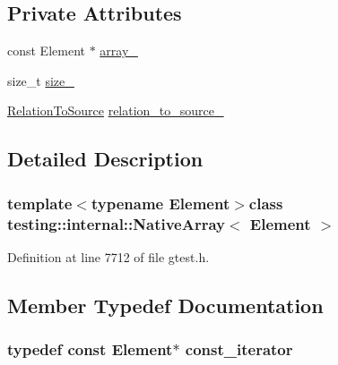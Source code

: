 \subsection*{\-Private \-Attributes}
\begin{DoxyCompactItemize}
\item 
const \-Element $\ast$ \hyperlink{classtesting_1_1internal_1_1NativeArray_a31f6e6efcce9fbf668b824a86a909496}{array\-\_\-}
\item 
size\-\_\-t \hyperlink{classtesting_1_1internal_1_1NativeArray_a5f31775800bbb46b35b5791def1f3acc}{size\-\_\-}
\item 
\hyperlink{namespacetesting_1_1internal_ac00b9b1c1f19789e7b9ffda5a5d6cbf6}{\-Relation\-To\-Source} \hyperlink{classtesting_1_1internal_1_1NativeArray_a60cdb26cc04b8a24e80287106524f1bc}{relation\-\_\-to\-\_\-source\-\_\-}
\end{DoxyCompactItemize}


\subsection{\-Detailed \-Description}
\subsubsection*{template$<$typename \-Element$>$class testing\-::internal\-::\-Native\-Array$<$ Element $>$}



\-Definition at line 7712 of file gtest.\-h.



\subsection{\-Member \-Typedef \-Documentation}
\hypertarget{classtesting_1_1internal_1_1NativeArray_a673a2c2010a7e9bdcc7b6b75d54121f5}{
\subsubsection[{const\-\_\-iterator}]{\setlength{\rightskip}{0pt plus 5cm}typedef const \-Element$\ast$ {\bf const\-\_\-iterator}}}\label{d6/de6/classtesting_1_1internal_1_1NativeArray_a673a2c2010a7e9bdcc7b6b75d54121f5}


